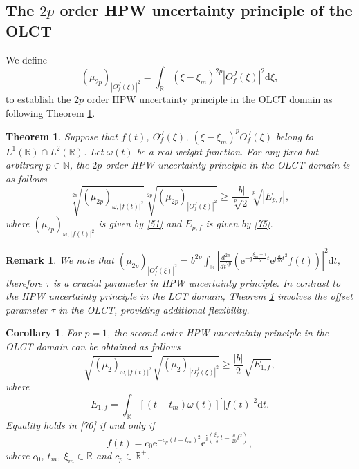 \documentclass[preprint,12pt]{elsarticle}
\newtheorem{thm}{Theorem}
\newtheorem{remark}{Remark}
\newtheorem{corollary}{Corollary}
\begin{document}
\subsection{The $2p$ order HPW uncertainty principle of the OLCT}
We define
\begin{equation}
\label{53}
(\mu_{2p})_{\left| O_f^J(\xi) \right|^2} = \int_{\mathbb{R}} (\xi-\xi_m)^{2p} \left|O_f^J(\xi) \right|^2 \mathrm{d}\xi,
\end{equation}
to establish the $2p$ order HPW uncertainty principle in the OLCT domain as following Theorem \ref{thm3.2}. 
\begin{thm}
	\label{thm3.2}
	Suppose that $f(t)$, $O_f^J(\xi)$, $(\xi-\xi_m)^p O_f^J(\xi)$ belong to $L^1(\mathbb{R}) \cap L^2(\mathbb{R})$. Let $\omega(t)$ be a real weight function. For any fixed but arbitrary $p \in \mathbb{N}$, the $2p$ order HPW uncertainty principle in the OLCT domain is as follows
	\begin{equation}
	\label{17}
	\sqrt[2p]{(\mu_{2p})_{\omega,\left|f(t) \right|^2}} \sqrt[2p]{(\mu_{2p})_{\left| O_f^J(\xi) \right|^2}} \ge \frac{|b|}{\sqrt[p]{2}} \sqrt[p]{\left|E_{p,f}\right|},
	\end{equation}
	where $(\mu_{2p})_{\omega,\left|f(t) \right|^2}$ is given by \eqref{51} and $E_{p,f}$ is given by \eqref{75}.
\end{thm}
\begin{remark}
	We note that $(\mu_{2p})_{\left| O_f^J(\xi) \right|^2} = b^{2p} \int_{\mathbb{R}} \left| \frac{d^{2p}}{dt^{2p}} \left(\mathrm{e}^{-\mathrm{j} \frac{\xi_m-\tau}{b} t} \mathrm{e}^{\mathrm{j} \frac{a}{2b} t^2}  f(t) \right) \right|^2 \mathrm{d} t$, therefore $\tau$ is a crucial parameter in HPW uncertainty principle. In contrast to the HPW uncertainty principle in the LCT domain, Theorem \ref{thm3.2} involves the offset parameter $\tau$ in the OLCT, providing additional flexibility.
\end{remark}
\begin{corollary}
	\label{co1}
	For $p=1$, the second-order HPW uncertainty principle in the OLCT domain can be obtained as follows
	\begin{equation}
	\label{70}
	\sqrt{(\mu_{2})_{\omega,\left|f(t) \right|^2}} \sqrt{(\mu_{2})_{\left| O_f^J(\xi) \right|^2}} \ge \frac{|b|}{2} \sqrt{E_{1,f}},
	\end{equation}
	where
	\begin{equation}
	E_{1,f} = \int_{\mathbb{R}} \left[ \left(t-t_m \right) \omega(t) \right]^{'} \left|f(t)\right|^2 \mathrm{d}t.
	\end{equation}
	Equality holds in \eqref{70} if and only if
	\begin{equation}
	\label{72}
	f(t) = c_0 \mathrm{e}^{-c_p(t-t_m)^2}\mathrm{e}^{\mathrm{j}(\frac{\xi_m}{b}t-\frac{a}{2b}t^2)},
	\end{equation}
	where $c_0$, $t_m$, $\xi_m \in \mathbb{R}$ and $c_p \in \mathbb{R}^+$.
\end{corollary}
\end{document}
